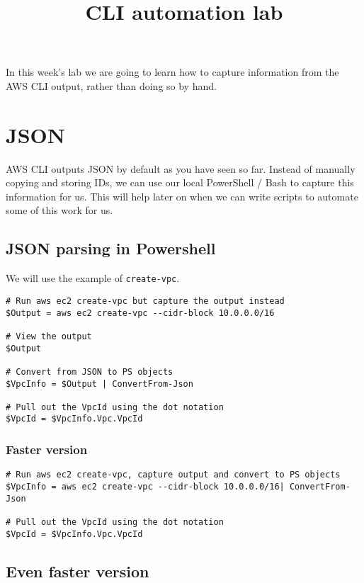 \documentclass{pgnotes}
\title{CLI automation lab}
\begin{document}
\maketitle

In this week's lab we are going to learn how to capture information from the AWS CLI output, rather than doing so by hand.

\section{JSON}

AWS CLI outputs JSON by default as you have seen so far.
Instead of manually copying and storing IDs, we can use our local PowerShell / Bash to capture this information for us.
This will help later on when we can write scripts to automate some of this work for us.

\subsection{JSON parsing in Powershell}

We will use the example of \texttt{create-vpc}.
\begin{verbatim}
# Run aws ec2 create-vpc but capture the output instead
$Output = aws ec2 create-vpc --cidr-block 10.0.0.0/16

# View the output
$Output

# Convert from JSON to PS objects
$VpcInfo = $Output | ConvertFrom-Json

# Pull out the VpcId using the dot notation
$VpcId = $VpcInfo.Vpc.VpcId
\end{verbatim}

\subsubsection{Faster version}

\begin{verbatim}
# Run aws ec2 create-vpc, capture output and convert to PS objects
$VpcInfo = aws ec2 create-vpc --cidr-block 10.0.0.0/16| ConvertFrom-Json 

# Pull out the VpcId using the dot notation
$VpcId = $VpcInfo.Vpc.VpcId
\end{verbatim}

\subsection{Even faster version}
\end{document}
